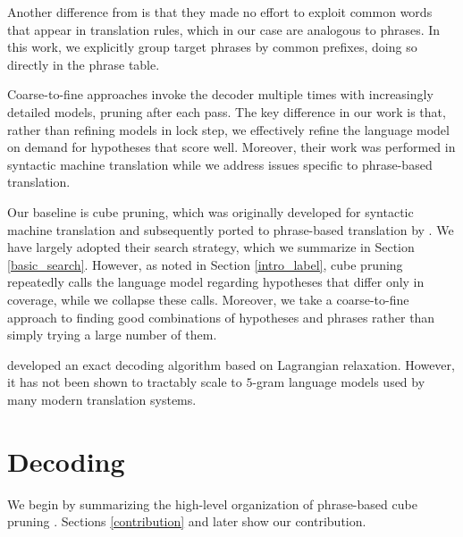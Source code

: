 \documentclass[11pt]{article}
\begin{document}
Another difference from  is that they made no effort to exploit common words that appear in translation rules, which in our case are analogous to phrases.  In this work, we explicitly group target phrases by common prefixes, doing so directly in the phrase table.  

Coarse-to-fine approaches \cite{coarsetofine,coarsetofineorig} invoke the decoder multiple times with increasingly detailed models, pruning after each pass.  The key difference in our work is that, rather than refining models in lock step, we effectively refine the language model on demand for hypotheses that score well.  Moreover, their work was performed in syntactic machine translation while we address issues specific to phrase-based translation.  

Our baseline is cube pruning, which was originally developed for syntactic machine translation \cite{cubepruning} and subsequently ported to phrase-based translation by .  We have largely adopted their search strategy, which we summarize in Section \ref{basic_search}.  However, as noted in Section \ref{intro_label}, cube pruning repeatedly calls the language model regarding hypotheses that differ only in coverage, while we collapse these calls.  Moreover, we take a coarse-to-fine approach to finding good combinations of hypotheses and phrases rather than simply trying a large number of them.  

 developed an exact decoding algorithm based on Lagrangian relaxation.  However, it has not been shown to tractably scale to $5$-gram language models used by many modern translation systems.  


\section{Decoding}
We begin by summarizing the high-level organization of phrase-based cube pruning \cite{pharaoh,moses,cubit}.  Sections \ref{contribution} and later show our contribution.  
\end{document}
